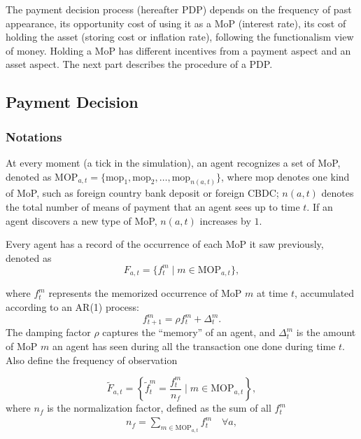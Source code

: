 The payment decision process (hereafter PDP) depends on the frequency of past
appearance, its opportunity cost of using it as a MoP (interest rate), its cost
of holding the asset (storing cost or inflation rate), following the
functionalism view of money. Holding a MoP has different incentives from a
payment aspect and an asset aspect. The next part describes the procedure of a PDP\@.

\subsection{Payment Decision}

\newcommand{\MOP}{\mathrm{MOP}}
\newcommand{\mop}{\mathrm{mop}}

\subsubsection*{Notations}

At every moment (a tick in the simulation), an agent recognizes a set of MoP,
denoted as $\MOP_{a,t} = \{ \mop_1, \mop_2, \dots, \mop_{n(a,t)} \}$, where
$\mop$ denotes one kind of MoP, such as foreign country bank deposit or foreign
CBDC\@; $n(a,t)$ denotes the total number of means of payment that an agent sees
up to time $t$. If an agent discovers a new type of MoP, $n(a,t)$ increases by $1$.

Every agent has a record of the occurrence of each MoP it saw previously, denoted as
\begin{equation}
   F_{a,t} = \{f^m_t \mid m \in \MOP_{a,t}\} ,
\end{equation}

where $f^m_t$ represents the memorized occurrence of MoP $m$ at time $t$, accumulated according to an AR(1) process:
\begin{equation}
   f^m_{t+1} = \rho f^m_t + \Delta^m_t .
\end{equation}
The damping factor $\rho$ captures the ``memory'' of an agent, and $\Delta^m_t$
is the amount of MoP $m$ an agent has seen during all the transaction one done
during time $t$.
Also define the frequency of observation

\begin{equation}
   \tilde{F}_{a,t} = \left\{ \tilde{f}^m_t = \frac{f^m_t}{n_f} \mid  m \in \MOP_{a,t}\right\},
\end{equation}
where $n_f$ is the normalization factor, defined as the sum of all $f^m_t$
\begin{eqnarray*}
   n_{f} = \sum_{m \in \MOP_{a,t}} f^m_t \quad \forall a ,
\end{eqnarray*}

